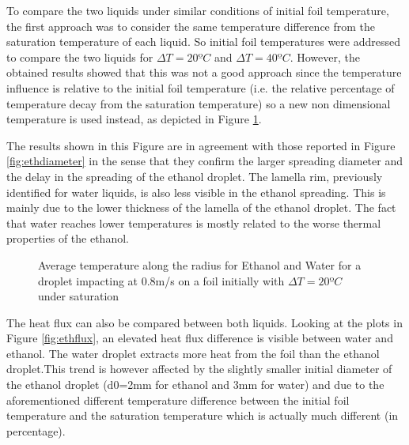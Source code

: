 \par To compare the two liquids under similar conditions of initial foil temperature, the first approach was to consider the same temperature difference from the saturation temperature of each liquid. So initial foil temperatures were addressed to compare the two liquids for $\Delta T=20ºC$ and $\Delta T=40ºC$. However, the obtained results showed that this was not a good approach since the temperature influence is relative to the initial foil temperature (i.e. the relative percentage of temperature decay from the saturation temperature) so a new non dimensional temperature is used instead, as depicted in Figure \ref{fig:ethtemp}.\\
\par The results shown in this Figure are in agreement with those reported in Figure \ref{fig:ethdiameter} in the sense that they confirm the larger spreading diameter and the delay in the spreading of the ethanol droplet. The lamella rim, previously identified for water liquids, is also less visible in the ethanol spreading. This is mainly due to the lower thickness of the lamella of the ethanol droplet. The fact that water reaches lower temperatures is mostly related to the worse thermal properties of the ethanol.\\

\begin{figure}[h]
\centering
\subfigure[2 ms]{}
\subfigure[6 ms]{}
\subfigure[12 ms]{}
\subfigure[24 ms]{}
\caption{Average temperature along the radius for Ethanol and Water for a droplet impacting at 0.8m/s on a foil initially with $\Delta T=20ºC$ under saturation}
\label{fig:ethtemp}
\end{figure}

\par The heat flux can also be compared between both liquids. Looking at the plots in Figure \ref{fig:ethflux}, an elevated heat flux difference is visible between water and ethanol. The water droplet extracts more heat from the foil than the ethanol droplet.This trend is however affected by the slightly smaller initial diameter of the ethanol droplet (d0=2mm for ethanol and 3mm for water) and due to the aforementioned different temperature difference between the initial foil temperature and the saturation temperature which is actually much different (in percentage).\\

